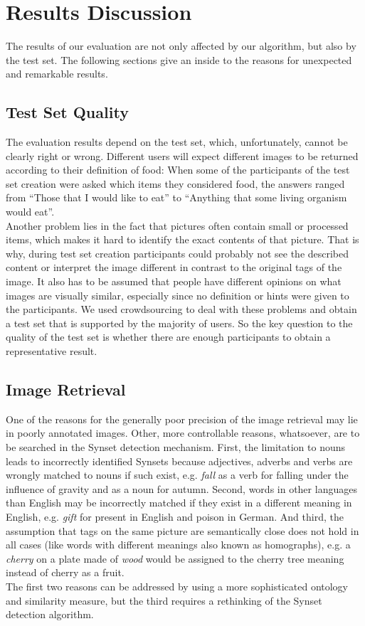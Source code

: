 %
\section{Results Discussion}
\label{sec_discussion}

The results of our evaluation are not only affected by our algorithm, but also by the test set. The following sections give an inside to the reasons for unexpected and remarkable results. 

\subsection{Test Set Quality}
The evaluation results depend on the test set, which, unfortunately, cannot be clearly right or wrong. Different users will expect different images to be returned according to their definition of food: When some of the participants of the test set creation were asked which items they considered food, the answers ranged from ``Those that I would like to eat'' to ``Anything that some living organism would eat''. \\
Another problem lies in the fact that pictures often contain small or processed items, which makes it hard to identify the exact contents of that picture. That is why, during test set creation participants could probably not see the described content or interpret the image different in contrast to the original tags of the image.
It also has to be assumed that people have different opinions on what images are visually similar, especially since no definition or hints were given to the participants. We used crowdsourcing to deal with these problems and obtain a test set that is supported by the majority of users. So the key question to the quality of the test set is whether there are enough participants to obtain a representative result.

\subsection{Image Retrieval}
One of the reasons for the generally poor precision of the image retrieval may lie in poorly annotated images.
Other, more controllable reasons, whatsoever, are to be searched in the Synset detection mechanism.
First, the limitation to nouns leads to incorrectly identified Synsets because adjectives, adverbs and verbs are wrongly matched to nouns if such exist, e.g. \emph{fall} as a verb for falling under the influence of gravity and as a noun for autumn.
Second, words in other languages than English may be incorrectly matched if they exist in a different meaning in English, e.g. \emph{gift} for present in English and poison in German.
And third, the assumption that tags on the same picture are semantically close does not hold in all cases (like words with different meanings also known as homographs), e.g. a \emph{cherry} on a plate made of \emph{wood} would be assigned to the cherry tree meaning instead of cherry as a fruit. \\
The first two reasons can be addressed by using a more sophisticated ontology and similarity measure, but the third requires a rethinking of the Synset detection algorithm.

